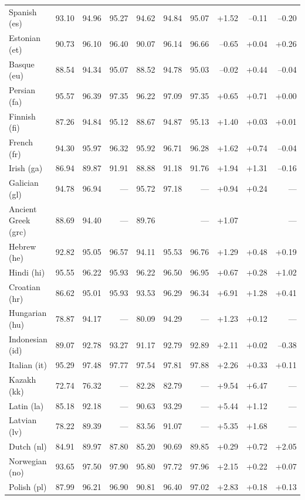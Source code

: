 \documentclass[11pt,letterpaper]{article}
\begin{document}
\begin{table}
\begin{tabular}{l|rrr|rrr|rrr}
Spanish (es) & 93.10 & 94.96 & 95.27 & 94.62 & 94.84 & 95.07 & +1.52 & --0.11 & --0.20\\
Estonian (et) & 90.73 & 96.10 & 96.40 & 90.07 & 96.14 & 96.66 & --0.65 & +0.04 & +0.26\\
Basque (eu) & 88.54 & 94.34 & 95.07 & 88.52 & 94.78 & 95.03 & --0.02 & +0.44 & --0.04\\
Persian (fa) & 95.57 & 96.39 & 97.35 & 96.22 & 97.09 & 97.35 & +0.65 & +0.71 & +0.00\\
Finnish (fi) & 87.26 & 94.84 & 95.12 & 88.67 & 94.87 & 95.13 & +1.40 & +0.03 & +0.01\\
French (fr) & 94.30 & 95.97 & 96.32 & 95.92 & 96.71 & 96.28 & +1.62 & +0.74 & --0.04\\
Irish (ga) & 86.94 & 89.87 & 91.91 & 88.88 & 91.18 & 91.76 & +1.94 & +1.31 & --0.16\\
Galician (gl) & 94.78 & 96.94 & --- & 95.72 & 97.18 & --- & +0.94 & +0.24 & ---\\
Ancient Greek (grc) & 88.69 & 94.40 & --- & 89.76 &  & --- & +1.07 &  & ---\\
Hebrew (he) & 92.82 & 95.05 & 96.57 & 94.11 & 95.53 & 96.76 & +1.29 & +0.48 & +0.19\\
Hindi (hi) & 95.55 & 96.22 & 95.93 & 96.22 & 96.50 & 96.95 & +0.67 & +0.28 & +1.02\\
Croatian (hr) & 86.62 & 95.01 & 95.93 & 93.53 & 96.29 & 96.34 & +6.91 & +1.28 & +0.41\\
Hungarian (hu) & 78.87 & 94.17 & --- & 80.09 & 94.29 & --- & +1.23 & +0.12 & ---\\
Indonesian (id) & 89.07 & 92.78 & 93.27 & 91.17 & 92.79 & 92.89 & +2.11 & +0.02 & --0.38\\
Italian (it) & 95.29 & 97.48 & 97.77 & 97.54 & 97.81 & 97.88 & +2.26 & +0.33 & +0.11\\
Kazakh (kk) & 72.74 & 76.32 & --- & 82.28 & 82.79 & --- & +9.54 & +6.47 & ---\\
Latin (la) & 85.18 & 92.18 & --- & 90.63 & 93.29 & --- & +5.44 & +1.12 & ---\\
Latvian (lv) & 78.22 & 89.39 & --- & 83.56 & 91.07 & --- & +5.35 & +1.68 & ---\\
Dutch (nl) & 84.91 & 89.97 & 87.80 & 85.20 & 90.69 & 89.85 & +0.29 & +0.72 & +2.05\\
Norwegian (no) & 93.65 & 97.50 & 97.90 & 95.80 & 97.72 & 97.96 & +2.15 & +0.22 & +0.07\\
Polish (pl) & 87.99 & 96.21 & 96.90 & 90.81 & 96.40 & 97.02 & +2.83 & +0.18 & +0.13\\

\end{tabular}
\end{table}
\end{document}
